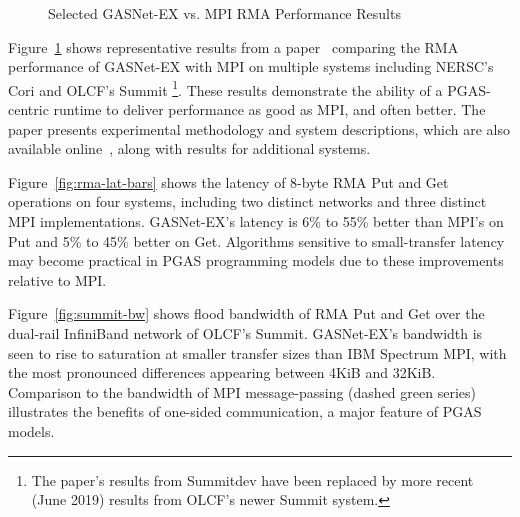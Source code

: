 \begin{figure}[htb]
  \centering
  \caption{\label{fig:gasnet-ex-rma} Selected GASNet-EX vs. MPI RMA Performance Results}
\end{figure}

Figure~\ref{fig:gasnet-ex-rma} shows representative results from a
paper~\cite{gasnet-lcpc18} comparing
the RMA performance of GASNet-EX with MPI on multiple systems including
NERSC's Cori and OLCF's Summit%
\footnote{The paper's results from Summitdev
have been replaced by more recent (June 2019) results from OLCF's newer Summit system.}.
These results demonstrate the ability of a PGAS-centric runtime to
deliver performance as good as MPI, and often better.
%
The paper presents experimental methodology and system descriptions, which are
also available online~\cite{gasnet-site}, along with results for additional
systems.

Figure~\ref{fig:rma-lat-bars} shows the latency of 8-byte RMA Put and Get operations on
four systems, including two distinct networks and three distinct MPI
implementations.
%
GASNet-EX's latency is 6\% to 55\% better than MPI's on Put and 5\% to 45\%
better on Get.
%
Algorithms sensitive to small-transfer latency may become practical in PGAS
programming models due to these improvements relative to MPI.

Figure~\ref{fig:summit-bw} shows flood bandwidth of RMA Put and Get over the
dual-rail InfiniBand network of OLCF's Summit.
GASNet-EX's bandwidth is seen to rise to saturation at smaller
transfer sizes than IBM Spectrum MPI, with the most pronounced differences
appearing between 4KiB and 32KiB.
%
Comparison to the bandwidth of MPI message-passing (dashed green series) illustrates the
benefits of one-sided communication, a major feature of PGAS models.


